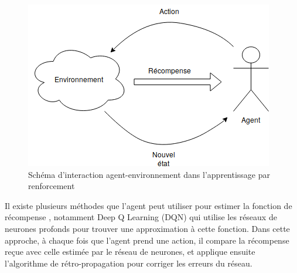\begin{figure}[H]
	\centering
	\includegraphics[width=.5\linewidth]{images/DM/RLSchema.png} 
	\caption{Schéma d'interaction agent-environnement dans l'apprentissage par renforcement}\label{RLS}
\end{figure}
\par Il existe plusieurs méthodes que l'agent peut utiliser pour estimer la fonction de récompense \citep{Dimitri2012}, notamment Deep Q Learning (DQN) \citep{Mnih2015} qui utilise les réseaux de neurones profonds pour trouver une approximation à cette fonction. Dans cette approche, à chaque fois que l'agent prend une action, il compare la récompense reçue avec celle estimée par le réseau de neurones, et applique ensuite l'algorithme de rétro-propagation pour corriger les erreurs du réseau. 

